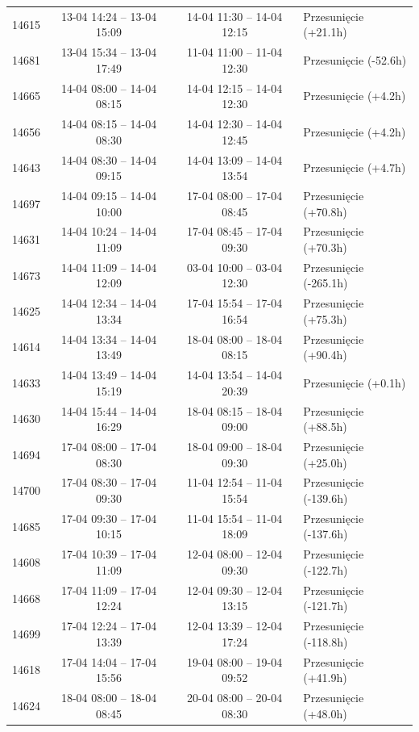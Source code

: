 \begin{table}[htbp]
\begin{tabular}{|r|c|c|l|}
14615 & 13-04 14:24 -- 13-04 15:09 & 14-04 11:30 -- 14-04 12:15 & Przesunięcie (+21.1h) \\ 
14681 & 13-04 15:34 -- 13-04 17:49 & 11-04 11:00 -- 11-04 12:30 & Przesunięcie (-52.6h) \\ 
14665 & 14-04 08:00 -- 14-04 08:15 & 14-04 12:15 -- 14-04 12:30 & Przesunięcie (+4.2h) \\ 
14656 & 14-04 08:15 -- 14-04 08:30 & 14-04 12:30 -- 14-04 12:45 & Przesunięcie (+4.2h) \\ 
14643 & 14-04 08:30 -- 14-04 09:15 & 14-04 13:09 -- 14-04 13:54 & Przesunięcie (+4.7h) \\ 
14697 & 14-04 09:15 -- 14-04 10:00 & 17-04 08:00 -- 17-04 08:45 & Przesunięcie (+70.8h) \\ 
14631 & 14-04 10:24 -- 14-04 11:09 & 17-04 08:45 -- 17-04 09:30 & Przesunięcie (+70.3h) \\ 
14673 & 14-04 11:09 -- 14-04 12:09 & 03-04 10:00 -- 03-04 12:30 & Przesunięcie (-265.1h) \\ 
14625 & 14-04 12:34 -- 14-04 13:34 & 17-04 15:54 -- 17-04 16:54 & Przesunięcie (+75.3h) \\ 
14614 & 14-04 13:34 -- 14-04 13:49 & 18-04 08:00 -- 18-04 08:15 & Przesunięcie (+90.4h) \\ 
14633 & 14-04 13:49 -- 14-04 15:19 & 14-04 13:54 -- 14-04 20:39 & Przesunięcie (+0.1h) \\ 
14630 & 14-04 15:44 -- 14-04 16:29 & 18-04 08:15 -- 18-04 09:00 & Przesunięcie (+88.5h) \\ 
14694 & 17-04 08:00 -- 17-04 08:30 & 18-04 09:00 -- 18-04 09:30 & Przesunięcie (+25.0h) \\ 
14700 & 17-04 08:30 -- 17-04 09:30 & 11-04 12:54 -- 11-04 15:54 & Przesunięcie (-139.6h) \\ 
14685 & 17-04 09:30 -- 17-04 10:15 & 11-04 15:54 -- 11-04 18:09 & Przesunięcie (-137.6h) \\ 
14608 & 17-04 10:39 -- 17-04 11:09 & 12-04 08:00 -- 12-04 09:30 & Przesunięcie (-122.7h) \\ 
14668 & 17-04 11:09 -- 17-04 12:24 & 12-04 09:30 -- 12-04 13:15 & Przesunięcie (-121.7h) \\ 
14699 & 17-04 12:24 -- 17-04 13:39 & 12-04 13:39 -- 12-04 17:24 & Przesunięcie (-118.8h) \\ 
14618 & 17-04 14:04 -- 17-04 15:56 & 19-04 08:00 -- 19-04 09:52 & Przesunięcie (+41.9h) \\ 
14624 & 18-04 08:00 -- 18-04 08:45 & 20-04 08:00 -- 20-04 08:30 & Przesunięcie (+48.0h) \\ 

\end{tabular}
\end{table}
